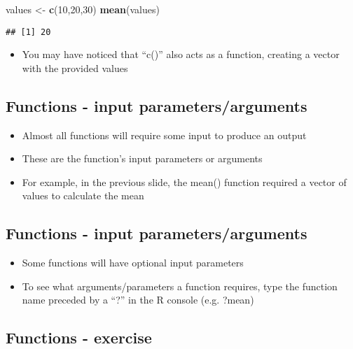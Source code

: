 \documentclass[]{article}
\newenvironment{Shaded}{\begin{snugshade}}{\end{snugshade}}
\newcommand{\KeywordTok}[1]{\textcolor[rgb]{0.13,0.29,0.53}{\textbf{#1}}}
\newcommand{\DecValTok}[1]{\textcolor[rgb]{0.00,0.00,0.81}{#1}}
\newcommand{\StringTok}[1]{\textcolor[rgb]{0.31,0.60,0.02}{#1}}
\newcommand{\NormalTok}[1]{#1}
\providecommand{\tightlist}{%
  \setlength{\itemsep}{0pt}\setlength{\parskip}{0pt}}
\begin{document}
\begin{Shaded}
\begin{Highlighting}[]
\NormalTok{values <-}\StringTok{ }\KeywordTok{c}\NormalTok{(}\DecValTok{10}\NormalTok{,}\DecValTok{20}\NormalTok{,}\DecValTok{30}\NormalTok{)}
\KeywordTok{mean}\NormalTok{(values)}
\end{Highlighting}
\end{Shaded}

\begin{verbatim}
## [1] 20
\end{verbatim}

\begin{itemize}
\tightlist
\item
  You may have noticed that ``c()'' also acts as a function, creating a
  vector with the provided values
\end{itemize}

\subsection{Functions - input
parameters/arguments}\label{functions---input-parametersarguments}

\begin{itemize}
\tightlist
\item
  Almost all functions will require some input to produce an output
\item
  These are the function's input parameters or arguments
\item
  For example, in the previous slide, the mean() function required a
  vector of values to calculate the mean
\end{itemize}

\subsection{Functions - input
parameters/arguments}\label{functions---input-parametersarguments-1}

\begin{itemize}
\tightlist
\item
  Some functions will have optional input parameters
\item
  To see what arguments/parameters a function requires, type the
  function name preceded by a ``?'' in the R console (e.g. ?mean)
\end{itemize}

\subsection{Functions - exercise}\label{functions---exercise}
\end{document}
